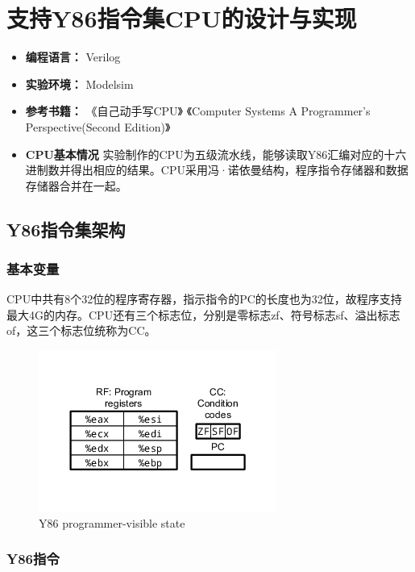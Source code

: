 \section{支持Y86指令集CPU的设计与实现}\label{ux652fux6301y86ux6307ux4ee4ux96c6cpuux7684ux8bbeux8ba1ux4e0eux5b9eux73b0}

\begin{itemize}
\item
  \textbf{编程语言：} Verilog
\item
  \textbf{实验环境：} Modelsim
\item
  \textbf{参考书籍：} 《自己动手写CPU》 《Computer Systems A
  Programmer's Perspective(Second Edition)》
\item
  \textbf{CPU基本情况}
  实验制作的CPU为五级流水线，能够读取Y86汇编对应的十六进制数并得出相应的结果。CPU采用冯·诺依曼结构，程序指令存储器和数据存储器合并在一起。
\end{itemize}

\subsection{Y86指令集架构}\label{y86ux6307ux4ee4ux96c6ux67b6ux6784}

\subsubsection{基本变量}\label{ux57faux672cux53d8ux91cf}

CPU中共有8个32位的程序寄存器，指示指令的PC的长度也为32位，故程序支持最大4G的内存。CPU还有三个标志位，分别是零标志zf、符号标志sf、溢出标志of，这三个标志位统称为CC。

\begin{figure}[htbp]
\centering
\includegraphics{img/state.png}
\caption{Y86 programmer-visible state}
\end{figure}

\subsubsection{Y86指令}\label{y86ux6307ux4ee4}

